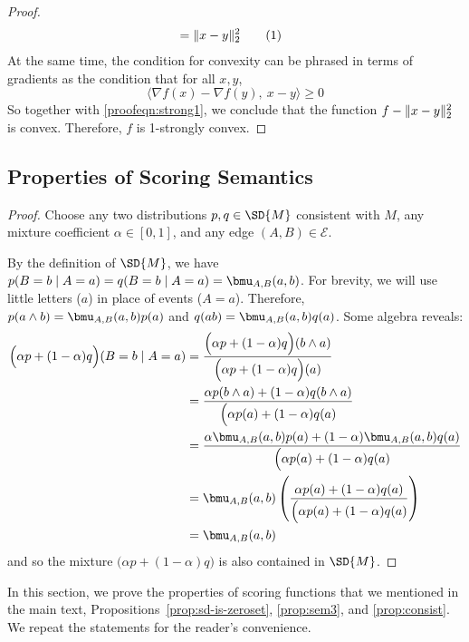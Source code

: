 \documentclass[letterpaper]{article} %
\theoremstyle{plain}
\theoremstyle{definition}
\theoremstyle{remark}
\DeclarePairedDelimiter{\norm}{\lVert}{\rVert}
\newcommand\numberthis{\addtocounter{equation}{1}\tag{\theequation}}
\newcommand{\Ed}{\mathcal E}
\begin{document}
{\begin{proof}
\begin{align*}
			&= \norm{x-y}^2_2 \numberthis\label{proofeqn:strong1}
	\end{align*}
	At the same time, the condition for convexity can be phrased in terms of gradients as the condition that for all $x,y$,
	\[  \Big\langle \nabla f(x) - \nabla f(y),~ x-y\Big\rangle \geq 0\]
	So together with \eqref{proofeqn:strong1}, we conclude that the function $f - \norm{x-y}^2_2$ is convex. Therefore, $f$ is 1-strongly convex.
\end{proof}

	}
	
\subsection{Properties of Scoring Semantics}


	\begin{vfull}
	\thmsetconvex*
	\begin{proof}
		Choose any two distributions $p, q \in \SD{M}$ consistent with $M$, any mixture coefficient $\alpha \in [0,1]$, and any edge $(A,B) \in \Ed$.
		
		By the definition of $\SD{M}$, we have $p(B = b \mid A = a) = q(B = b \mid A = a) = \bmu_{A,B}(a,b)$.  
		For brevity, we will use little letters ($a$) in place of events ($A = a$).
		Therefore, $p(a\land b) = \bmu_{A,B}(a,b) p(a)$ and $q(ab) = \bmu_{A,B}(a,b) q(a)$. Some algebra reveals:
		\begin{align*}
			\Big( \alpha p + (1-\alpha) q \Big) (B = b \mid A = a) &= 
			\frac{\Big( \alpha p + (1-\alpha) q \Big) (b \land a)}{\Big( \alpha p + (1-\alpha) q \Big) (a)} \\
			&= \frac{ \alpha p(b \land a) + (1-\alpha) q(b \land a) }{\Big( \alpha p(a) + (1-\alpha) q (a)} \\
			&= \frac{ \alpha \bmu_{A,B}(a,b) p(a) + (1-\alpha) \bmu_{A,B}(a,b) q(a) }{\Big( \alpha p(a) + (1-\alpha) q (a)} \\
			&=\bmu_{A,B}(a,b) \left(\frac{ \alpha  p(a) + (1-\alpha) q(a) }{\Big( \alpha p(a) + (1-\alpha) q (a)}\right)\\
			&= \bmu_{A,B}(a,b)
		\end{align*}
		and so the mixture $\Big(\alpha p + (1-\alpha) q \Big)$ is also contained in $\SD{M}$.
	\end{proof}
\end{vfull}
In this section, we prove the properties of scoring functions that we
mentioned in the main text,
Propositions~\ref{prop:sd-is-zeroset}, \ref{prop:sem3}, and
\ref{prop:consist}.  We repeat the statements for the reader's convenience.
\end{document}
